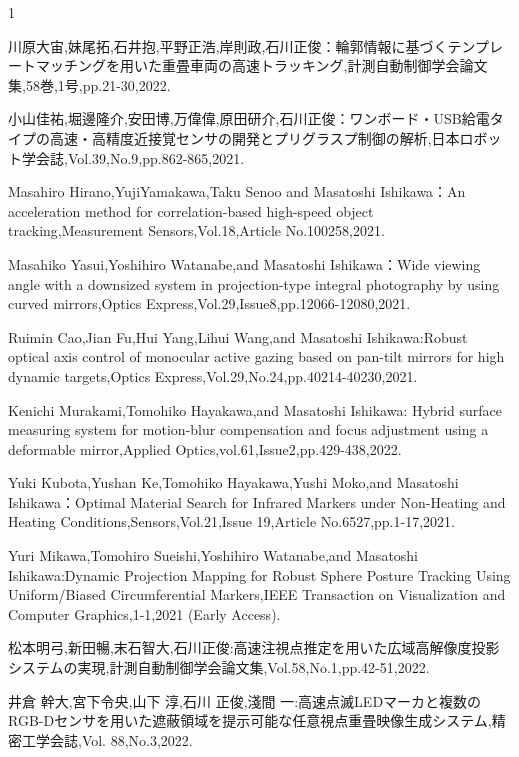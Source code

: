 \begin{雑誌論文}{1}

川原大宙,妹尾拓,石井抱,平野正浩,岸則政,石川正俊：輪郭情報に基づくテンプレートマッチングを用いた重畳車両の高速トラッキング,計測自動制御学会論文集,58巻,1号,pp.21-30,2022.

小山佳祐,堀邊隆介,安田博,万偉偉,原田研介,石川正俊：ワンボード・USB給電タイプの高速・高精度近接覚センサの開発とプリグラスプ制御の解析,日本ロボット学会誌,Vol.39,No.9,pp.862-865,2021.

Masahiro Hirano,YujiYamakawa,Taku Senoo and Masatoshi Ishikawa：An acceleration method for correlation-based high-speed object tracking,Measurement Sensors,Vol.18,Article No.100258,2021.

Masahiko Yasui,Yoshihiro Watanabe,and Masatoshi Ishikawa：Wide viewing angle with a downsized system in projection-type integral photography by using curved mirrors,Optics Express,Vol.29,Issue8,pp.12066-12080,2021.

Ruimin Cao,Jian Fu,Hui Yang,Lihui Wang,and Masatoshi Ishikawa:Robust optical axis control of monocular active gazing based on pan-tilt mirrors for high dynamic targets,Optics Express,Vol.29,No.24,pp.40214-40230,2021.

Kenichi Murakami,Tomohiko Hayakawa,and Masatoshi Ishikawa: Hybrid surface measuring system for motion-blur compensation and focus adjustment using a deformable mirror,Applied Optics,vol.61,Issue2,pp.429-438,2022.

Yuki Kubota,Yushan Ke,Tomohiko Hayakawa,Yushi Moko,and Masatoshi Ishikawa：Optimal Material Search for Infrared Markers under Non-Heating and Heating Conditions,Sensors,Vol.21,Issue 19,Article No.6527,pp.1-17,2021.


Yuri Mikawa,Tomohiro Sueishi,Yoshihiro Watanabe,and Masatoshi Ishikawa:Dynamic Projection Mapping for Robust Sphere Posture Tracking Using Uniform/Biased Circumferential Markers,IEEE Transaction on Visualization and Computer Graphics,1-1,2021 (Early Access).

松本明弓,新田暢,末石智大,石川正俊:高速注視点推定を用いた広域高解像度投影システムの実現,計測自動制御学会論文集,Vol.58,No.1,pp.42-51,2022.

井倉 幹大,宮下令央,山下 淳,石川 正俊,淺間 一:高速点滅LEDマーカと複数のRGB-Dセンサを用いた遮蔽領域を提示可能な任意視点重畳映像生成システム,精密工学会誌,Vol. 88,No.3,2022.


\end{雑誌論文}
